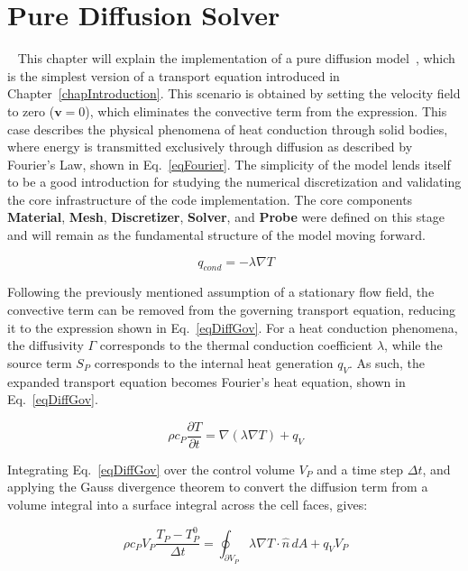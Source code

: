 \section{Pure Diffusion Solver}~\label{chapDiffusion}
This chapter will explain the implementation of a pure diffusion model~\cite{FernandezOro, Versteeg2007}, which is the simplest version of a transport equation introduced in Chapter~\ref{chapIntroduction}. This scenario is obtained by setting the velocity field to zero ($\mathbf{v} = 0$), which eliminates the convective term from the expression. This case describes the physical phenomena of heat conduction through solid bodies, where energy is transmitted exclusively through diffusion as described by Fourier's Law, shown in Eq.~\eqref{eqFourier}. The simplicity of the model lends itself to be a good introduction for studying the numerical discretization and validating the core infrastructure of the code implementation. The core components \textbf{Material}, \textbf{Mesh}, \textbf{Discretizer}, \textbf{Solver}, and \textbf{Probe} were defined on this stage and will remain as the fundamental structure of the model moving forward.

\begin{equation}~\label{eqFourier}
    q_{cond} = - \lambda \nabla T
\end{equation}

Following the previously mentioned assumption of a stationary flow field, the convective term can be removed from the governing transport equation, reducing it to the expression shown in Eq.~\ref{eqDiffGov}. For a heat conduction phenomena, the diffusivity $\Gamma$ corresponds to the thermal conduction coefficient $\lambda$, while the source term $S_P$ corresponds to the internal heat generation $q_V$. As such, the expanded transport equation becomes Fourier's heat equation, shown in Eq.~\eqref{eqDiffGov}.

\begin{equation}~\label{eqDiffGov}
        \rho c_P\frac{\partial T}{\partial t} = \nabla (\lambda \nabla T) + q_{V}
\end{equation}

Integrating Eq.~\eqref{eqDiffGov} over the control volume $V_P$ and a time step $\Delta t$, and applying the Gauss divergence theorem to convert the diffusion term from a volume integral into a surface integral across the cell faces, gives:

\begin{equation}~\label{eqDiffInt}
    \rho c_P V_P \frac{T_P - T^0_P}{\Delta t} =
    \oint_{\partial V_P} \lambda \nabla T \cdot \hat{n} \, dA + q_V V_P
\end{equation}

